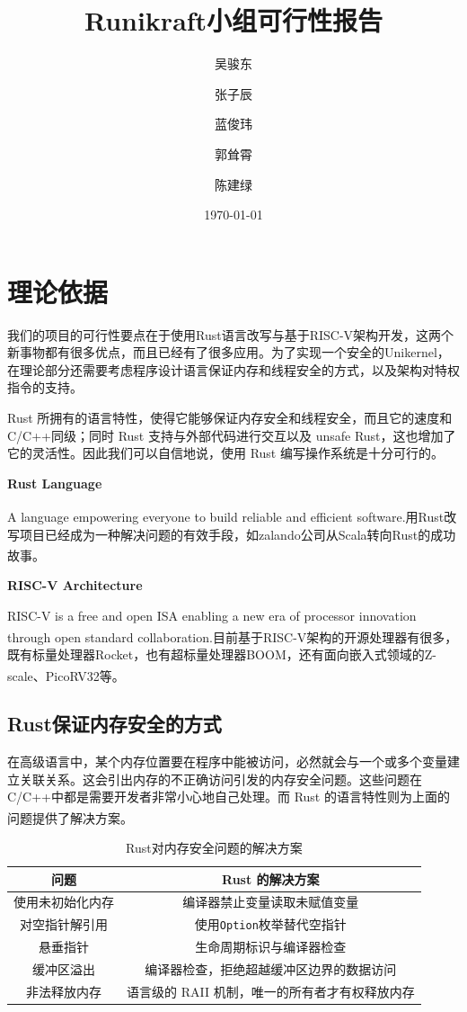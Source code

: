 \documentclass[UTF8,fontset=none,linespread=1.15]{ctexart}
\let\nosupcite\cite
\renewcommand*{\cite}[1]{\textsuperscript{\nosupcite{#1}}}
\begin{document}
\sffamily %
\title{\bfseries Runikraft小组\quad 可行性报告}
\author{吴骏东\and 张子辰\and 蓝俊玮\and 郭耸霄\and 陈建绿}
\date{\today}
\maketitle

\tableofcontents

\section{理论依据}
我们的项目的可行性要点在于使用Rust语言改写与基于RISC-V架构开发，这两个新事物都有很多优点，而且已经有了很多应用。为了实现一个安全的Unikernel，在理论部分还需要考虑程序设计语言保证内存和线程安全的方式，以及架构对特权指令的支持。

Rust 所拥有的语言特性，使得它能够保证内存安全和线程安全，而且它的速度和C/C++同级；同时 Rust 支持与外部代码进行交互以及 unsafe Rust，这也增加了它的灵活性。因此我们可以自信地说，使用 Rust 编写操作系统是十分可行的。

\textbf{Rust Language}

A language empowering everyone to build reliable and efficient software.\cite{7}用Rust改写项目已经成为一种解决问题的有效手段，如zalando公司从Scala转向Rust的成功故事。\cite{3}

\textbf{RISC-V Architecture}

RISC-V is a free and open ISA enabling a new era of processor innovation through open standard collaboration.\cite{0}目前基于RISC-V架构的开源处理器有很多，既有标量处理器Rocket，也有超标量处理器BOOM，还有面向嵌入式领域的Z-scale、PicoRV32等。\cite{2}
\subsection{Rust保证内存安全的方式}
在高级语言中，某个内存位置要在程序中能被访问，必然就会与一个或多个变量建立关联关系。这会引出内存的不正确访问引发的内存安全问题。这些问题在C/C++中都是需要开发者非常小心地自己处理。而 Rust 的语言特性则为上面的问题提供了解决方案。\cite{8}
\begin{table}[H]
\centering
\caption{Rust对内存安全问题的解决方案}
\begin{tabular}{|c|c|}
\hline
\textbf{问题} & \textbf{Rust 的解决方案}\\\hline
使用未初始化内存&编译器禁止变量读取未赋值变量\\\hline
对空指针解引用&使用\texttt{Option}枚举替代空指针\\\hline
悬垂指针&生命周期标识与编译器检查\\\hline
缓冲区溢出&编译器检查，拒绝超越缓冲区边界的数据访问\\\hline
非法释放内存&语言级的 RAII 机制，唯一的所有者才有权释放内存\\\hline
\end{tabular}
\end{table}
\end{document}
